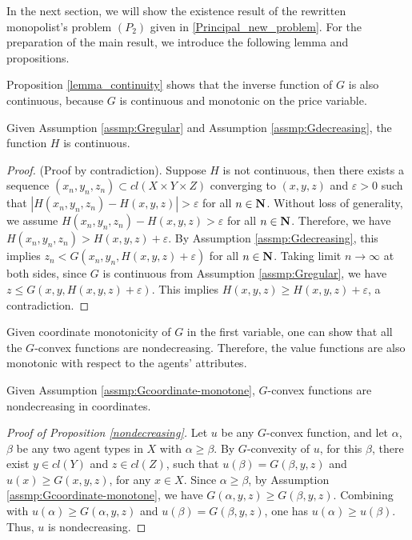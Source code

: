 \medskip
In the next section, we will show the existence result of the rewritten monopolist's problem $(P_2)$ given in \eqref{Principal_new_problem}. For the preparation of the main result, we introduce the following lemma and propositions.\medskip

Proposition \ref{lemma_continuity} shows that the inverse function of $G$ is also continuous, because $G$ is continuous and monotonic on the price variable.\medskip

\begin{proposition}\label{lemma_continuity}
	Given Assumption \ref{assmp:Gregular} and Assumption \ref{assmp:Gdecreasing}, the function $H$ is continuous.
\end{proposition}

\begin{proof}%
	(Proof by contradiction). Suppose $H$ is not continuous, then there exists a sequence ${(x_n, y_n, z_n)} \subset cl(X\times Y \times Z)$ converging to $(x, y, z)$ and $\varepsilon >0$ such that $|H(x_n, y_n, z_n) - H(x,y,z)|>\varepsilon$ for all $n\in \mathbf{N}$. Without loss of generality, we assume $H(x_n, y_n, z_n) - H(x,y,z)>\varepsilon$ for all $n\in \mathbf{N}$. Therefore, we have $H(x_n, y_n, z_n) > H(x,y,z)+\varepsilon$. By Assumption \ref{assmp:Gdecreasing}, this implies $z_n < G(x_n, y_n, H(x,y,z)+\varepsilon)$ for all $n\in \mathbf{N}$. Taking limit $n\rightarrow \infty$ at both sides, since $G$ is continuous from Assumption \ref{assmp:Gregular}, we have $z \le G(x, y, H(x,y,z)+\varepsilon)$. This implies $H(x,y,z) \ge H(x,y,z)+\varepsilon$, a contradiction.
\end{proof}

Given coordinate monotonicity of $G$ in the first variable, one can show that all the $G$-convex functions are nondecreasing. Therefore, the value functions are also monotonic with respect to the agents' attributes.\medskip

\begin{proposition}\label{nondecreasing}
	Given Assumption \ref{assmp:Gcoordinate-monotone}, $G$-convex functions are nondecreasing in coordinates.
\end{proposition}

\begin{proof}[Proof of Proposition \ref{nondecreasing}]
	Let $u$ be any $G$-convex function, and let $\alpha$, $\beta$ be any two agent types in $X$ with $\alpha \ge \beta$. By $G$-convexity of $u$, for this $\beta$, there exist $y\in cl(Y)$ and $z \in cl(Z)$, such that $u(\beta)=G(\beta, y,z)$ and $u(x)\ge G(x, y,z)$, for any $x\in X$. Since $\alpha \ge \beta$, by Assumption \ref{assmp:Gcoordinate-monotone}, we have $G(\alpha, y,z)\ge G(\beta,y,z)$. Combining with $u(\alpha)\ge G(\alpha, y,z)$ and $u(\beta) = G(\beta,y,z)$, one has $u(\alpha) \ge u(\beta)$. Thus, $u$ is nondecreasing.
\end{proof}

